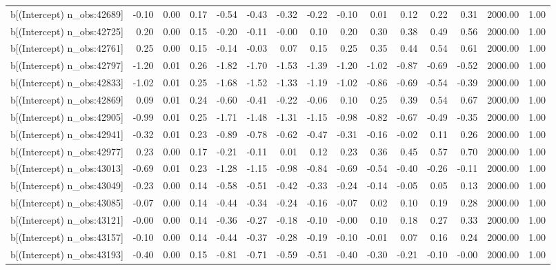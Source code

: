 \begin{table}[ht]
\begin{tabular}{rrrrrrrrrrrrrrr}
  b[(Intercept) n\_obs:42689] & -0.10 & 0.00 & 0.17 & -0.54 & -0.43 & -0.32 & -0.22 & -0.10 & 0.01 & 0.12 & 0.22 & 0.31 & 2000.00 & 1.00 \\ 
  b[(Intercept) n\_obs:42725] & 0.20 & 0.00 & 0.15 & -0.20 & -0.11 & -0.00 & 0.10 & 0.20 & 0.30 & 0.38 & 0.49 & 0.56 & 2000.00 & 1.00 \\ 
  b[(Intercept) n\_obs:42761] & 0.25 & 0.00 & 0.15 & -0.14 & -0.03 & 0.07 & 0.15 & 0.25 & 0.35 & 0.44 & 0.54 & 0.61 & 2000.00 & 1.00 \\ 
  b[(Intercept) n\_obs:42797] & -1.20 & 0.01 & 0.26 & -1.82 & -1.70 & -1.53 & -1.39 & -1.20 & -1.02 & -0.87 & -0.69 & -0.52 & 2000.00 & 1.00 \\ 
  b[(Intercept) n\_obs:42833] & -1.02 & 0.01 & 0.25 & -1.68 & -1.52 & -1.33 & -1.19 & -1.02 & -0.86 & -0.69 & -0.54 & -0.39 & 2000.00 & 1.00 \\ 
  b[(Intercept) n\_obs:42869] & 0.09 & 0.01 & 0.24 & -0.60 & -0.41 & -0.22 & -0.06 & 0.10 & 0.25 & 0.39 & 0.54 & 0.67 & 2000.00 & 1.00 \\ 
  b[(Intercept) n\_obs:42905] & -0.99 & 0.01 & 0.25 & -1.71 & -1.48 & -1.31 & -1.15 & -0.98 & -0.82 & -0.67 & -0.49 & -0.35 & 2000.00 & 1.00 \\ 
  b[(Intercept) n\_obs:42941] & -0.32 & 0.01 & 0.23 & -0.89 & -0.78 & -0.62 & -0.47 & -0.31 & -0.16 & -0.02 & 0.11 & 0.26 & 2000.00 & 1.00 \\ 
  b[(Intercept) n\_obs:42977] & 0.23 & 0.00 & 0.17 & -0.21 & -0.11 & 0.01 & 0.12 & 0.23 & 0.36 & 0.45 & 0.57 & 0.70 & 2000.00 & 1.00 \\ 
  b[(Intercept) n\_obs:43013] & -0.69 & 0.01 & 0.23 & -1.28 & -1.15 & -0.98 & -0.84 & -0.69 & -0.54 & -0.40 & -0.26 & -0.11 & 2000.00 & 1.00 \\ 
  b[(Intercept) n\_obs:43049] & -0.23 & 0.00 & 0.14 & -0.58 & -0.51 & -0.42 & -0.33 & -0.24 & -0.14 & -0.05 & 0.05 & 0.13 & 2000.00 & 1.00 \\ 
  b[(Intercept) n\_obs:43085] & -0.07 & 0.00 & 0.14 & -0.44 & -0.34 & -0.24 & -0.16 & -0.07 & 0.02 & 0.10 & 0.19 & 0.28 & 2000.00 & 1.00 \\ 
  b[(Intercept) n\_obs:43121] & -0.00 & 0.00 & 0.14 & -0.36 & -0.27 & -0.18 & -0.10 & -0.00 & 0.10 & 0.18 & 0.27 & 0.33 & 2000.00 & 1.00 \\ 
  b[(Intercept) n\_obs:43157] & -0.10 & 0.00 & 0.14 & -0.44 & -0.37 & -0.28 & -0.19 & -0.10 & -0.01 & 0.07 & 0.16 & 0.24 & 2000.00 & 1.00 \\ 
  b[(Intercept) n\_obs:43193] & -0.40 & 0.00 & 0.15 & -0.81 & -0.71 & -0.59 & -0.51 & -0.40 & -0.30 & -0.21 & -0.10 & -0.00 & 2000.00 & 1.00 \\ 

\end{tabular}
\end{table}
